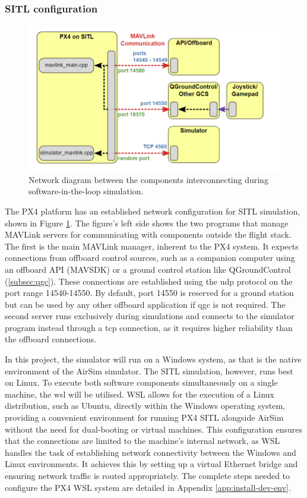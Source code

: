 \subsubsection{SITL configuration}

\begin{figure}
  \centering
  \includegraphics[width=\textwidth,keepaspectratio]{img/px4-ports.png}
  \caption{Network diagram between the components interconnecting during software-in-the-loop simulation.}
  \label{fig:px4-ports}
\end{figure}

The PX4 platform has an established network configuration for SITL simulation, shown in Figure \ref{fig:px4-ports}. The figure’s left side shows the two programs that manage MAVLink servers for communicating with components outside the flight stack. The first is the main MAVLink manager, inherent to the PX4 system. It expects connections from offboard control sources, such as a companion computer using an offboard API (MAVSDK) or a ground control station like QGroundControl (\ref{subsec:qgc}). These connections are established using the \acrshort{udp} protocol on the port range 14540-14550. By default, port 14550 is reserved for a ground station but can be used by any other offboard application if \acrshort{qgc} is not required.
The second server runs exclusively during simulations and connects to the simulator program instead through a \acrshort{tcp} connection, as it requires higher reliability than the offboard connections.

In this project, the simulator will run on a Windows system, as that is the native environment of the AirSim simulator. The SITL simulation, however, runs best on Linux. To execute both software components simultaneously on a single machine, the \acrfull{wsl} \cite{wsl-learn} will be utilised. WSL allows for the execution of a Linux distribution, such as Ubuntu, directly within the Windows operating system, providing a convenient environment for running PX4 SITL alongside AirSim without the need for dual-booting or virtual machines. This configuration ensures that the connections are limited to the machine’s internal network, as WSL handles the task of establishing network connectivity between the Windows and Linux environments. It achieves this by setting up a virtual Ethernet bridge and ensuring network traffic is routed appropriately.
The complete steps needed to configure the PX4 WSL system are detailed in Appendix \ref{app:install-dev-env}.


